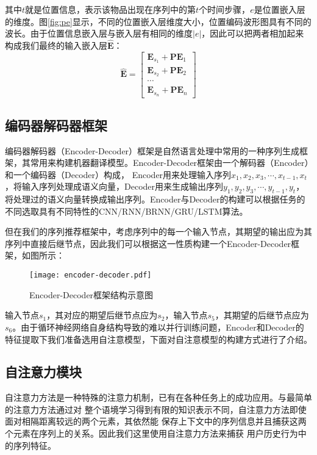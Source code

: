 其中$t$就是位置信息，表示该物品出现在序列中的第$t$个时间步骤，$e$是位置嵌入层的维度。图\ref{fig:pe}显示，不同的位置嵌入层维度大小，位置编码波形图具有不同的波长。由于位置信息嵌入层与嵌入层有相同的维度$|e|$，因此可以把两者相加起来构成我们最终的输入嵌入层$\widehat{\mathbf{E}}$：
\begin{equation}
	\label{fig:pe}
	\widehat{\mathbf{E}}=\left[ \begin{array}{c}{\mathbf{E}_{s_{1}}+\mathbf{PE}_{1}} \\ 
	{\mathbf{E}_{s_{2}}+\mathbf{PE}_{2}} \\ 
	\cdots \\
	{\mathbf{E}_{s_{n}}+\mathbf{PE}_{n}}\end{array}\right]
\end{equation}

\subsection{编码器解码器框架}
编码器解码器（Encoder-Decoder）框架是自然语言处理中常用的一种序列生成框架，其常用来构建机器翻译模型。Encoder-Decoder框架由一个解码器（Encoder）和一个编码器（Decoder）构成，
Encoder用来处理输入序列$x_{1},x_{2},x_{3},\cdots ,x_{t-1},x_{t}$，将输入序列处理成语义向量，Decoder用来生成输出序列$y_{1},y_{2},y_{3},\cdots ,y_{t-1},y_{t}$，将处理过的语义向量转换成输出序列。Encoder与Decoder的构建可以根据任务的不同选取具有不同特性的CNN/RNN/BRNN/GRU/LSTM算法。


但在我们的序列推荐框架中，考虑序列中的每一个输入节点，其期望的输出应为其序列中直接后继节点，因此我们可以根据这一性质构建一个Encoder-Decoder框架，如图所示：

\begin{figure}
\centering
\texttt{[image: encoder-decoder.pdf]} %
\caption{Encoder-Decoder框架结构示意图}
\label{encoder}
\end{figure}


输入节点$s_{1}$，其对应的期望后继节点应为$s_{2}$，输入节点$s_{5}$，其期望的后继节点应为$s_{6}$。由于循环神经网络自身结构导致的难以并行训练问题，Encoder和Decoder的特征提取下我们准备选用自注意模型，下面对自注意模型的构建方式进行了介绍。

\subsection{自注意力模块}

自注意力方法是一种特殊的注意力机制，已有在各种任务上的成功应用。与最简单的注意力方法通过对%
整个语境学习得到有限的知识表示不同，自注意力方法即使面对相隔距离较远的两个元素，其依然能%
保存上下文中的序列信息并且捕获这两个元素在序列上的关系。因此我们这里使用自注意力方法来捕获%
用户历史行为中的序列特征。

